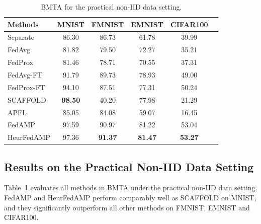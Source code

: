 \begin{table}[t]
\setlength{\tabcolsep}{2pt}
\centering
\begin{tabular}{l|ccccc} 
 \toprule
Methods & MNIST & FMNIST & EMNIST & CIFAR100 \\
 \midrule
 Separate & 86.30	& 86.73 &	61.78 &	39.99 \\
 \hline
 FedAvg  & 81.82 &	79.50	& 72.27 &	35.21
 \\
 FedProx & 81.46 &	78.71 &	70.55	& 37.31
 \\
 \hline
 FedAvg-FT & 91.79 &	89.73 &	78.93	& 49.00\\
 FedProx-FT &  94.10 & 87.51 &	77.31	&	50.24\\
 SCAFFOLD & \textbf{98.50} & 40.20 & 77.98 & 21.29\\
 APFL & 85.05 & 84.08 & 59.07 & 16.45\\
 \hline
 {FedAMP} & 97.59 & 90.97 & 81.22 & 53.04\\ 
 {HeurFedAMP} & 97.36	& \textbf{91.37} & \textbf{81.47} & \textbf{53.27} \\
 \bottomrule
\end{tabular}
\caption{BMTA for the practical non-IID data setting.}
\label{tab:result}
\end{table}

\subsection{Results on the Practical Non-IID Data Setting}\label{subsec:expres}

Table~\ref{tab:result} evaluates all methods in BMTA under the practical non-IID data setting. FedAMP and HeurFedAMP perform comparably well as SCAFFOLD on MNIST, and they significantly outperform all other methods on FMNIST, EMNIST and CIFAR100.

